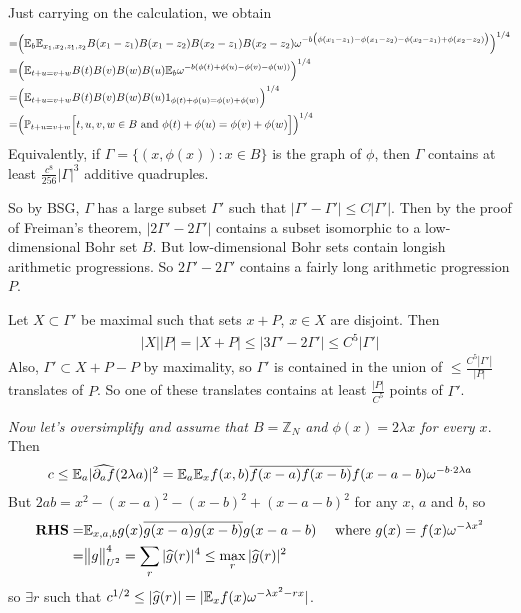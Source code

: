 \documentclass[12pt,a4paper]{report}
\renewcommand{\hat}{\widehat}
\begin{document}
Just carrying on the calculation, we obtain
\begin{align*}
= & \Big( \mathbb{E}_b \mathbb{E}_{x_1,x_2, z_1, z_2} B(x_1 - z_1) B(x_1 - z_2)B(x_2 - z_1) B(x_2 - z_2) \omega^{-b \big( \phi(x_1 - z_1) - \phi(x_1 - z_2) - \phi(x_2 - z_1) + \phi(x_2 -z_2) \big)} \Big)^{1/4} \\
= & \Big( \mathbb{E}_{t+u = v+w} B(t)B(v)B(w)B(u) \mathbb{E}_b \omega^{-b(\phi(t) + \phi(u) - \phi(v) -\phi(w))} \Big)^{1/4} \\
= & \Big( \mathbb{E}_{t+u = v+w} B(t)B(v)B(w)B(u) 1_{\phi(t)+\phi(u) = \phi(v) + \phi(w)} \Big)^{1/4} \\
= & \Big( \mathbb{P}_{t+u = v+w} \Big[ t,u,v,w\in B \text{ and } \phi(t)+\phi(u) = \phi(v) + \phi(w) \Big] \Big)^{1/4}
\end{align*}
Equivalently, if $\Gamma = \{ (x,\phi(x)) : x\in B \}$ is the graph of $\phi$, then $\Gamma$ contains at least $\frac{c^8}{256}|\Gamma|^3$ additive quadruples.

\quad So by BSG, $\Gamma$ has a large subset $\Gamma'$ such that $|\Gamma' - \Gamma'| \leq C |\Gamma '|$. Then by the proof of Freiman's theorem, $|2\Gamma' - 2\Gamma'|$ contains a subset isomorphic to a low-dimensional Bohr set $B$. But low-dimensional Bohr sets contain longish arithmetic progressions. So $2\Gamma' - 2\Gamma'$ contains a fairly long arithmetic progression $P$.

\quad Let $X\subset \Gamma'$ be maximal such that sets $x+ P$, $x\in X$ are disjoint. Then
\begin{align*}
|X||P| = |X+P| \leq |3\Gamma' - 2\Gamma'| \leq C^5 |\Gamma '|
\end{align*}
Also, $\Gamma ' \subset X+P-P$ by maximality, so $\Gamma'$ is contained in the union of $\leq \frac{C^5 |\Gamma'|}{|P|}$ translates of $P$. So one of these translates contains at least $\frac{|P|}{C^5}$ points of $\Gamma'$.
\s

\emph{Now let's oversimplify and assume that $B= \mathbb{Z}_N$ and $\phi(x) = 2\lambda x$ for every $x$}. Then
\begin{align*}
c\leq \avg_a |\hat{\partial_a f}(2\lambda a)|^2 = \avg_a \avg_{x} f(x,b) \bar{f(x-a)} \bar{f(x-b)} f(x-a-b) \omega^{-b\cdot 2\lambda a}
\end{align*}
But $2ab = x^2 - (x-a)^2 - (x-b)^2 + (x-a-b)^2$ for any $x$, $a$ and $b$, so
\begin{align*}
\textbf{RHS} =& \avg_{x,a,b} g(x) \bar{g(x-a)} \bar{g(x-b)} g(x-a-b) \quad \text{ where } g(x) = f(x) \omega^{-\lambda x^2} \\
=& \norms{g}{U^2}^4 = \sum_r |\hat{g}(r)|^4 \leq \max_r |\hat{g}(r)|^2
\end{align*}
so $\exists r$ such that $c^{1/2} \leq |\hat{g}(r)| = |\avg_x f(x)\omega^{-\lambda x^2 - rx}|$. 
\s
\end{document}
